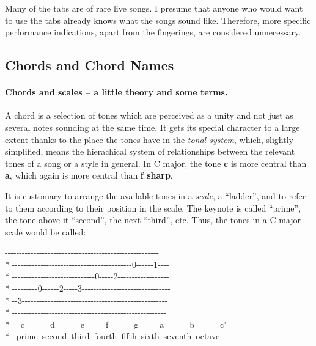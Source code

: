 Many of the tabs are of rare live songs. I presume that anyone who
would want to use the tabs already knows what the songs sound
like. Therefore, more specific performance indications, apart from the
fingerings, are considered unnecessary.

\subsection*{Chords and Chord Names}

\paragraph*{Chords and scales -- a little theory and some terms.} A
chord is a selection of tones which are perceived as a unity and not
just as several notes sounding at the same time. It gets its special
character to a large extent thanks to the place the tones have in the
\emph{tonal system}, which, slightly simplified, means the hierachical
system of relationships between the relevant tones of a song or a
style in general. In C major, the tone \textbf{c} is more central than
\textbf{a}, which again is more central than \textbf{f sharp}.

It is customary to arrange the available tones in a \emph{scale}, a
``{}ladder''{}, and to refer to them according to their position in
the scale. The keynote is called ``{}prime''{}, the tone above it
``{}second''{}, the next ``{}third''{}, etc. Thus, the tones in a C
major scale would be called:
\begin{pre}\begin{adjustwidth}{2em}{0em}
{-}{-}{-}{-}{-}{-}{-}{-}{-}{-}{-}{-}{-}{-}{-}{-}{-}{-}{-}{-}{-}{-}{-}{-}{-}{-}{-}{-}{-}{-}{-}{-}{-}{-}{-}{-}{-}{-}{-}{-}{-}{-}{-}{-}{-}{-}{-}{-}{-}{-}{-}{-}{-}{-}\\*
{-}{-}{-}{-}{-}{-}{-}{-}{-}{-}{-}{-}{-}{-}{-}{-}{-}{-}{-}{-}{-}{-}{-}{-}{-}{-}{-}{-}{-}{-}{-}{-}{-}{-}{-}{-}{-}{-}{-}{-}{-}{-}0{-}{-}{-}{-}{-}{-}1{-}{-}{-}{-}\\*
{-}{-}{-}{-}{-}{-}{-}{-}{-}{-}{-}{-}{-}{-}{-}{-}{-}{-}{-}{-}{-}{-}{-}{-}{-}{-}{-}{-}-0{-}{-}{-}{-}-2{-}{-}{-}{-}{-}{-}{-}{-}{-}{-}{-}{-}{-}{-}{-}{-}{-}{-}\\*
{-}{-}{-}{-}{-}{-}{-}{-}-0{-}{-}{-}{-}{-}{-}2{-}{-}{-}{-}-3{-}{-}{-}{-}{-}{-}{-}{-}{-}{-}{-}{-}{-}{-}{-}{-}{-}{-}{-}{-}{-}{-}{-}{-}{-}{-}{-}{-}{-}{-}-\\*
{-}{-}3{-}{-}{-}{-}{-}{-}{-}{-}{-}{-}{-}{-}{-}{-}{-}{-}{-}{-}{-}{-}{-}{-}{-}{-}{-}{-}{-}{-}{-}{-}{-}{-}{-}{-}{-}{-}{-}{-}{-}{-}{-}{-}{-}{-}{-}{-}{-}{-}{-}{-}-\\*
{-}{-}{-}{-}{-}{-}{-}{-}{-}{-}{-}{-}{-}{-}{-}{-}{-}{-}{-}{-}{-}{-}{-}{-}{-}{-}{-}{-}{-}{-}{-}{-}{-}{-}{-}{-}{-}{-}{-}{-}{-}{-}{-}{-}{-}{-}{-}{-}{-}{-}{-}{-}{-}{-}\\*
~~c~~~~~~d~~~~~~e~~~~~f~~~~~~g~~~~~a~~~~~~b~~~~~~c'\\*
~prime~second~third~fourth~fifth~sixth~seventh~octave
\end{adjustwidth}\end{pre}

